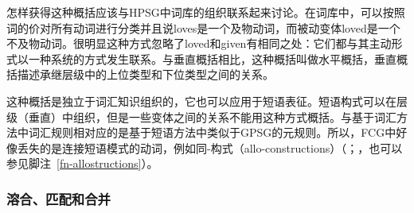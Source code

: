 怎样获得这种概括应该与HPSG中词库的组织联系起来讨论\citep{Flickinger87,Meurers2001a}。在词库中，可以按照词的价对所有动词进行分类并且说loves是一个及物动词，而被动变体loved是一个不及物动词。很明显这种方式忽略了loved和given有相同之处：它们都与其主动形式以一种系统的方式发生联系。与垂直概括相比，这种概括叫做水平概括，垂直概括描述承继层级中的上位类型和下位类型之间的关系。

这种概括是独立于词汇知识组织的，它也可以应用于短语表征。短语构式可以在层级（垂直）中组织，但是一些变体之间的关系不能用这种方式概括。与基于词汇方法中词汇规则相对应的是基于短语方法中类似于GPSG的元规则。所以，FCG中好像丢失的是连接短语模式的动词，例如同-构式（allo-constructions）（\citealp{Cappelle2006a}；\citealp[]{Goldberg2014a}，也可以参见脚注~\ref{fn-allostructions}）。

\subsubsection{溶合、匹配和合并}

